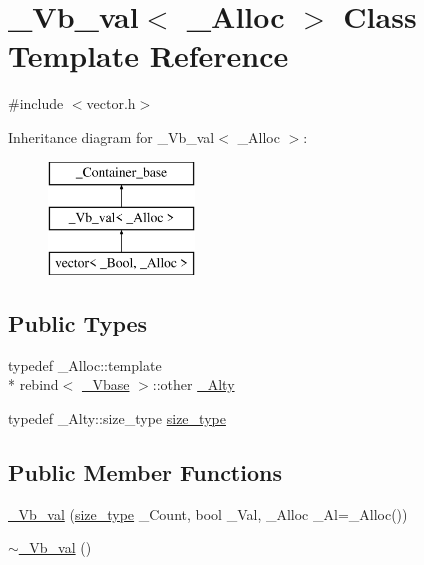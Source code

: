 \hypertarget{class___vb__val}{\section{\+\_\+\+Vb\+\_\+val$<$ \+\_\+\+Alloc $>$ Class Template Reference}
\label{class___vb__val}
}


{\ttfamily \#include $<$vector.\+h$>$}

Inheritance diagram for \+\_\+\+Vb\+\_\+val$<$ \+\_\+\+Alloc $>$\+:\begin{figure}[H]
\begin{center}
\leavevmode
\includegraphics[height=3.000000cm]{class___vb__val}
\end{center}
\end{figure}
\subsection*{Public Types}
\begin{DoxyCompactItemize}
\item 
typedef \+\_\+\+Alloc\+::template \\*
rebind$<$ \hyperlink{vector_8h_a1555a2f621ba9ade75bb9ce8bca77144}{\+\_\+\+Vbase} $>$\+::other \hyperlink{class___vb__val_a20c01f1d8456573db64c3f9098bb5eda}{\+\_\+\+Alty}
\item 
typedef \+\_\+\+Alty\+::size\+\_\+type \hyperlink{class___vb__val_aae6aa10bcd41d235b46f128df1198612}{size\+\_\+type}
\end{DoxyCompactItemize}
\subsection*{Public Member Functions}
\begin{DoxyCompactItemize}
\item 
\hyperlink{class___vb__val_a40d7d702dcab7f7f8aa893263bf501ff}{\+\_\+\+Vb\+\_\+val} (\hyperlink{class___vb__val_aae6aa10bcd41d235b46f128df1198612}{size\+\_\+type} \+\_\+\+Count, bool \+\_\+\+Val, \+\_\+\+Alloc \+\_\+\+Al=\+\_\+\+Alloc())
\item 
\hyperlink{class___vb__val_a9c4e8432d643ca9239347b7d6fdb05ab}{$\sim$\+\_\+\+Vb\+\_\+val} ()
\end{DoxyCompactItemize}

